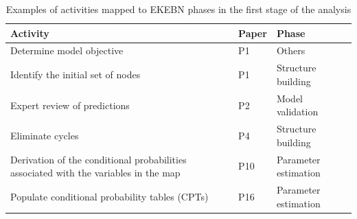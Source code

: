 \begin{table}[t]
\caption{Examples of activities mapped to EKEBN phases in the first stage of the analysis}
\label{tab:map_stage1_examples}
\centering
\small
\renewcommand{\arraystretch}{1.2}
\setlength{\tabcolsep}{8pt}

\begin{tabularx}{\linewidth}{>{\raggedright\arraybackslash}X
                              >{\centering\arraybackslash}p{1.2cm}
                              >{\raggedright\arraybackslash}p{2.5cm}}
\toprule
\textbf{Activity} & \textbf{Paper} & \textbf{Phase} \\
\midrule
Determine model objective & P1 & Others \\
Identify the initial set of nodes & P1 & Structure building \\
Expert review of predictions & P2 & Model validation \\
Eliminate cycles & P4 & Structure building \\
Derivation of the conditional probabilities associated with the variables in the map & P10 & Parameter estimation \\
Populate conditional probability tables (CPTs) & P16 & Parameter estimation \\
\bottomrule
\end{tabularx}
\end{table}


